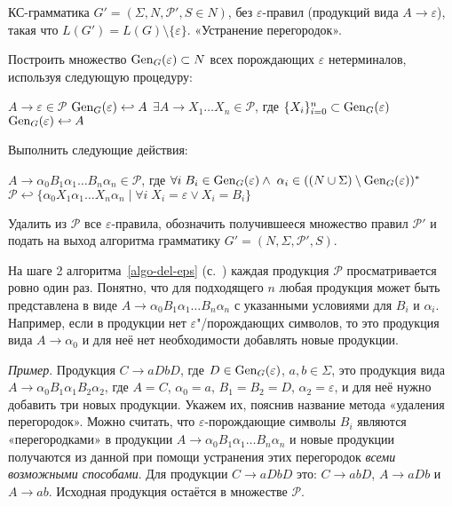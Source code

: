 {КС-грамматика $G'=(\Sigma, N, \mathcal P', S \in N)$, без
$\varepsilon$-правил (продукций вида $A \to \varepsilon$), такая что
$L(G')=L(G) \setminus \{ \varepsilon \}$.}
{«Устранение перегородок».}
{
  \item Построить множество $\operatorname{Gen}_G(\varepsilon) \subset N$ всех порождающих
  $\varepsilon$ нетерминалов, используя следующую процедуру:
  \begin{codebox}
  \li   \For $A \to \varepsilon \in \mathcal P$
  \zi   \Do
            $\operatorname{Gen}_G(\varepsilon) \hookleftarrow A$
        \End
  \li   \While $\exists A \to X_1 \ldots X_n \in \mathcal P$,
        где $\{ X_i \}_{i=0}^n \subset \operatorname{Gen}_G(\varepsilon)$
  \zi       \Do
            $\operatorname{Gen}_G(\varepsilon) \hookleftarrow A$
            \End
        \End
  \end{codebox}
  \item\label{remove-barriers} Выполнить следующие действия:
  \begin{codebox}
  \zi \For $A \to \alpha_0 B_1 \alpha_1 \ldots B_n \alpha_n \in \mathcal P$, где
  $\forall i \; B_i \in \operatorname{Gen}_G(\varepsilon) \wedge \;
  \alpha_i \in ((N \cup \Sigma) \setminus \operatorname{Gen}_G(\varepsilon))^*$
  \zi   \Do
        $\mathcal P \hookleftarrow
            \{ \alpha_0 X_1 \alpha_1 \ldots X_n \alpha_n \mid
            \forall i \; X_i = \varepsilon \vee X_i = B_i \}$
        \End
  \end{codebox}
  \item Удалить из $\mathcal P$ все $\varepsilon$-правила, обозначить
  получившееся множество правил $\mathcal P'$ и подать на выход алгоритма
  грамматику $G' = (N, \Sigma, \mathcal P', S)$.
}

\begin{myremark}
На шаге 2 алгоритма~\ref{algo-del-eps} (с.~\pageref{algo-del-eps}) каждая 
продукция $\mathcal P$ просматривается ровно
один раз. Понятно, что для подходящего $n$ любая продукция может быть
представлена в виде $A \to \alpha_0 B_1 \alpha_1 \ldots B_n \alpha_n$ с
указанными условиями для $B_i$ и $\alpha_i$. Например, если в продукции нет
$\varepsilon$"/порождающих символов, то это продукция вида $A \to
\alpha_0$ и для неё нет необходимости добавлять новые продукции.

\emph{Пример}. Продукция $C \to aDbD$, где $D \in \operatorname{Gen}_G(\varepsilon)$, $a, b \in
\Sigma$, это продукция вида $A \to \alpha_0 B_1 \alpha_1 B_2 \alpha_2$, где $A =
C$, $\alpha_0 = a$, $B_1 = B_2 = D$, $\alpha_2 = \varepsilon$, и для неё нужно
добавить три новых продукции. Укажем их, пояснив название метода «удаления
перегородок». Можно считать, что $\varepsilon$-порождающие символы $B_i$ являются
«перегородками» в продукции $A \to \alpha_0 B_1 \alpha_1 \ldots B_n \alpha_n$ и
новые продукции получаются из данной при помощи устранения этих перегородок \emph{всеми
возможными способами}. Для продукции $C \to aDbD$ это: $C \to abD$, $A \to aDb$ и
$A \to ab$. Исходная продукция остаётся в множестве $\mathcal P$.
\end{myremark}

